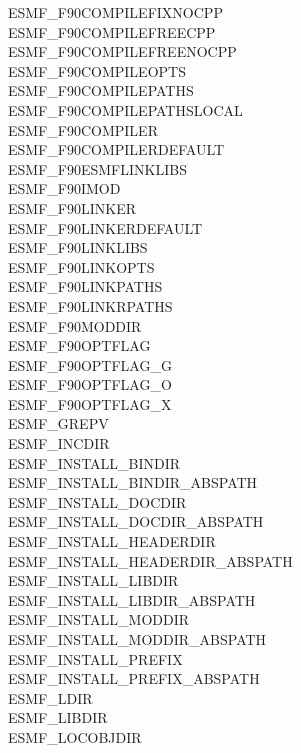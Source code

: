 \begin{description}
\item[ESMF\_F90COMPILEFIXNOCPP]
\item[ESMF\_F90COMPILEFREECPP]
\item[ESMF\_F90COMPILEFREENOCPP]
\item[ESMF\_F90COMPILEOPTS]
\item[ESMF\_F90COMPILEPATHS]
\item[ESMF\_F90COMPILEPATHSLOCAL]
\item[ESMF\_F90COMPILER]
\item[ESMF\_F90COMPILERDEFAULT]
\item[ESMF\_F90ESMFLINKLIBS]
\item[ESMF\_F90IMOD]
\item[ESMF\_F90LINKER]
\item[ESMF\_F90LINKERDEFAULT]
\item[ESMF\_F90LINKLIBS]
\item[ESMF\_F90LINKOPTS]
\item[ESMF\_F90LINKPATHS]
\item[ESMF\_F90LINKRPATHS]
\item[ESMF\_F90MODDIR]
\item[ESMF\_F90OPTFLAG]
\item[ESMF\_F90OPTFLAG\_G]
\item[ESMF\_F90OPTFLAG\_O]
\item[ESMF\_F90OPTFLAG\_X]
\item[ESMF\_GREPV]
\item[ESMF\_INCDIR]
\item[ESMF\_INSTALL\_BINDIR]
\item[ESMF\_INSTALL\_BINDIR\_ABSPATH]
\item[ESMF\_INSTALL\_DOCDIR]
\item[ESMF\_INSTALL\_DOCDIR\_ABSPATH]
\item[ESMF\_INSTALL\_HEADERDIR]
\item[ESMF\_INSTALL\_HEADERDIR\_ABSPATH]
\item[ESMF\_INSTALL\_LIBDIR]
\item[ESMF\_INSTALL\_LIBDIR\_ABSPATH]
\item[ESMF\_INSTALL\_MODDIR]
\item[ESMF\_INSTALL\_MODDIR\_ABSPATH]
\item[ESMF\_INSTALL\_PREFIX]
\item[ESMF\_INSTALL\_PREFIX\_ABSPATH]
\item[ESMF\_LDIR]
\item[ESMF\_LIBDIR]
\item[ESMF\_LOCOBJDIR]

\end{description}
